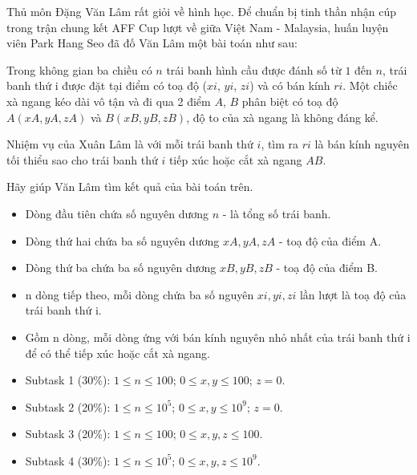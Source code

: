 \documentclass[12pt,a4paper,oneside]{article}
\begin{document}

\renewcommand{\baselinestretch}{1.25}
\setlength{\parskip}{1em}

Thủ môn Đặng Văn Lâm rất giỏi về hình học. Để chuẩn bị tinh thần nhận cúp trong trận chung kết AFF Cup lượt về giữa Việt Nam - Malaysia, huấn luyện viên Park Hang Seo đã đố Văn Lâm một bài toán như sau:

Trong không gian ba chiều có $n$ trái banh hình cầu được đánh số từ $1$ đến $n$, trái banh thứ i được đặt tại điểm có toạ độ ($xi$, $yi$, $zi$) và có bán kính $ri$. Một chiếc xà ngang kéo dài vô tận và đi qua 2 điểm $A$, $B$ phân biệt có toạ độ $A(xA,yA,zA)$ và $B(xB,yB,zB)$, độ to của xà ngang là không đáng kể.

Nhiệm vụ của Xuân Lâm là với mỗi trái banh thứ $i$, tìm ra $ri$ là bán kính nguyên tối thiểu sao cho trái banh thứ $i$ tiếp xúc hoặc cắt xà ngang $AB$. 

Hãy giúp Văn Lâm tìm kết quả của bài toán trên.

\renewcommand{\baselinestretch}{1.0}
\setlength{\parskip}{0.25em}


\begin{itemize}
\item Dòng đầu tiên chứa số nguyên dương $n$ - là tổng số trái banh.
\item Dòng thứ hai chứa ba số nguyên dương $xA, yA, zA$ - toạ độ của điểm A.
\item Dòng thứ ba chứa ba số nguyên dương $xB, yB, zB$ - toạ độ của điểm B.
\item n dòng tiếp theo, mỗi dòng chứa ba số nguyên $xi, yi, zi$ lần lượt là toạ độ của trái banh thứ i.
\end{itemize}


\begin{itemize}
\item Gồm n dòng, mỗi dòng ứng với bán kính nguyên nhỏ nhất của trái banh thứ i để có thể tiếp xúc hoặc cắt xà ngang.
\end{itemize}


\begin{example}
%
%
\end{example}


\begin{itemize}
\item Subtask 1 (30\%): $1 \leq n \leq 100$; $0 \leq x, y \leq 100$; $z = 0$.
\item Subtask 2 (20\%): $1 \leq n \leq 10^5$; $0 \leq x, y \leq 10^9$; $z = 0$.
\item Subtask 3 (20\%): $1 \leq n \leq 100$; $0 \leq x, y, z \leq 100$.
\item Subtask 4 (30\%): $1 \leq n \leq 10^5$; $0 \leq x, y, z \leq 10^9$.
\end{itemize}
\end{document}
